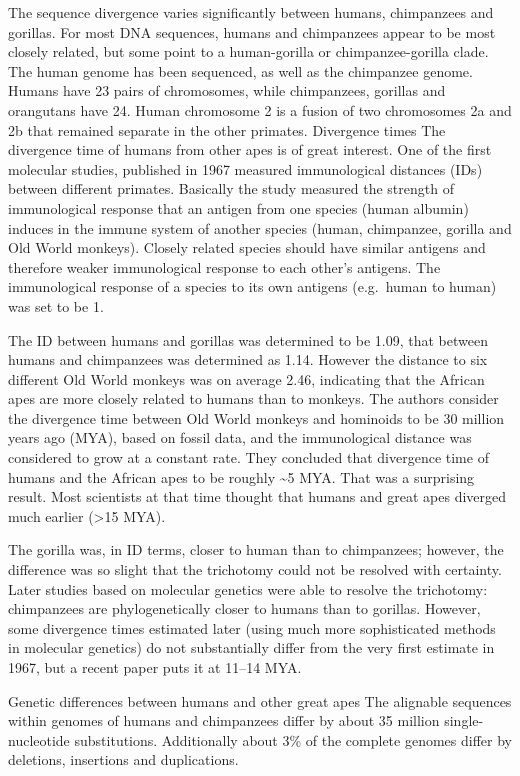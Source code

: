 The sequence divergence varies significantly between humans, chimpanzees and gorillas.
For most DNA sequences, humans and chimpanzees appear to be most closely related, but some point to a human-gorilla or chimpanzee-gorilla clade.
The human genome has been sequenced, as well as the chimpanzee genome. Humans have 23 pairs of chromosomes, while chimpanzees, gorillas and orangutans have 24. Human chromosome 2 is a fusion of two chromosomes 2a and 2b that remained separate in the other primates.
Divergence times
The divergence time of humans from other apes is of great interest. One of the first molecular studies, published in 1967 measured immunological distances (IDs) between different primates. Basically the study measured the strength of immunological response that an antigen from one species (human albumin) induces in the immune system of another species (human, chimpanzee, gorilla and Old World monkeys). Closely related species should have similar antigens and therefore weaker immunological response to each other's antigens. The immunological response of a species to its own antigens (e.g.~human to human) was set to be 1.

The ID between humans and gorillas was determined to be 1.09, that between humans and chimpanzees was determined as 1.14. However the distance to six different Old World monkeys was on average 2.46, indicating that the African apes are more closely related to humans than to monkeys. The authors consider the divergence time between Old World monkeys and hominoids to be 30 million years ago (MYA), based on fossil data, and the immunological distance was considered to grow at a constant rate. They concluded that divergence time of humans and the African apes to be roughly \textasciitilde{}5 MYA. That was a surprising result. Most scientists at that time thought that humans and great apes diverged much earlier (\textgreater{}15 MYA).

The gorilla was, in ID terms, closer to human than to chimpanzees; however, the difference was so slight that the trichotomy could not be resolved with certainty. Later studies based on molecular genetics were able to resolve the trichotomy: chimpanzees are phylogenetically closer to humans than to gorillas. However, some divergence times estimated later (using much more sophisticated methods in molecular genetics) do not substantially differ from the very first estimate in 1967, but a recent paper puts it at 11--14 MYA.

Genetic differences between humans and other great apes
The alignable sequences within genomes of humans and chimpanzees differ by about 35 million single-nucleotide substitutions. Additionally about 3\% of the complete genomes differ by deletions, insertions and duplications.

